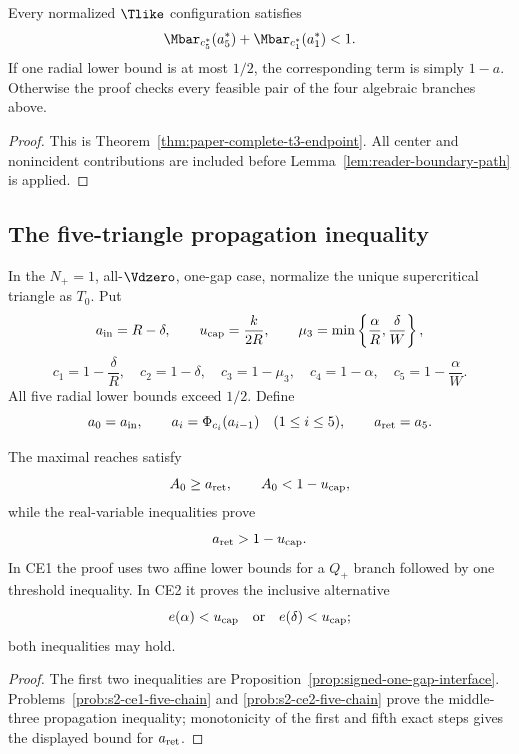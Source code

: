\begin{proposition}
\label{prop:body-t3-endpoint}
Every normalized $\Tlike$ configuration satisfies
\[
 \Mbar_{c_5^\ast}(a_5^\ast)+
 \Mbar_{c_1^\ast}(a_1^\ast)<1.
\]
If one radial lower bound is at most $1/2$, the corresponding term is simply
$1-a$.  Otherwise the proof checks every feasible pair of the four algebraic
branches above.
\end{proposition}

\begin{proof}
This is Theorem~\ref{thm:paper-complete-t3-endpoint}.  All center and
nonincident contributions are included before
Lemma~\ref{lem:reader-boundary-path} is applied.
\end{proof}

\subsection{The five-triangle propagation inequality}

\begin{definition}
\label{def:body-five-V-triangle-data}
In the $N_+=1$, all-$\Vdzero$, one-gap case, normalize the unique
supercritical triangle as $T_0$.  Put
\[
 a_{\rm in}=R-\delta,
 \qquad
 u_{\rm cap}=\frac{k}{2R},
 \qquad
 \mu_3=\min\left\{\frac{\alpha}{R},\frac{\delta}{W}\right\},
\]
\[
 c_1=1-\frac{\delta}{R},
 \quad
 c_2=1-\delta,
 \quad
 c_3=1-\mu_3,
 \quad
 c_4=1-\alpha,
 \quad
 c_5=1-\frac{\alpha}{W}.
\]
All five radial lower bounds exceed $1/2$.  Define
\[
 a_0=a_{\rm in},
 \qquad
 a_i=\Phi_{c_i}(a_{i-1})\quad(1\le i\le5),
 \qquad
 a_{\rm ret}=a_5.
\]
\end{definition}

\begin{proposition}
\label{prop:body-five-V-triangle-certificate}
The maximal reaches satisfy
\[
 A_0\ge a_{\rm ret},
 \qquad
 A_0<1-u_{\rm cap},
\]
while the real-variable inequalities prove
\[
 a_{\rm ret}>1-u_{\rm cap}.
\]
In CE1 the proof uses two affine lower bounds for a $Q_+$ branch followed by
one threshold inequality.  In CE2 it proves the inclusive alternative
\[
 e(\alpha)<u_{\rm cap}
 \quad\text{or}\quad
 e(\delta)<u_{\rm cap};
\]
both inequalities may hold.
\end{proposition}

\begin{proof}
The first two inequalities are Proposition~\ref{prop:signed-one-gap-interface}.
Problems~\ref{prob:s2-ce1-five-chain} and
\ref{prob:s2-ce2-five-chain} prove the middle-three propagation inequality;
monotonicity of the first and fifth exact steps gives the displayed bound for
$a_{\rm ret}$.
\end{proof}

